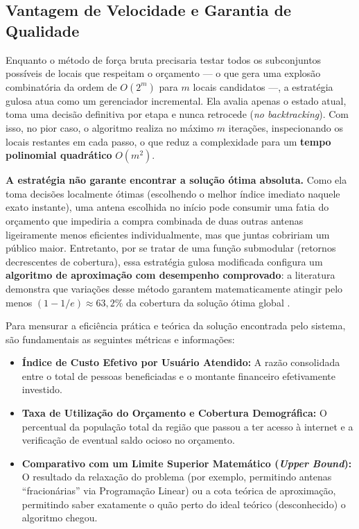 \subsection{Vantagem de Velocidade e Garantia de Qualidade}

Enquanto o método de força bruta precisaria testar todos os subconjuntos possíveis de locais que respeitam o orçamento --- o que gera uma explosão combinatória da ordem de $O(2^m)$ para $m$ locais candidatos ---, a estratégia gulosa atua como um gerenciador incremental. Ela avalia apenas o estado atual, toma uma decisão definitiva por etapa e nunca retrocede (\textit{no backtracking}). Com isso, no pior caso, o algoritmo realiza no máximo $m$ iterações, inspecionando os locais restantes em cada passo, o que reduz a complexidade para um \textbf{tempo polinomial quadrático} $O(m^2)$.

\textbf{A estratégia não garante encontrar a solução ótima absoluta.} Como ela toma decisões localmente ótimas (escolhendo o melhor índice imediato naquele exato instante), uma antena escolhida no início pode consumir uma fatia do orçamento que impediria a compra combinada de duas outras antenas ligeiramente menos eficientes individualmente, mas que juntas cobririam um público maior. Entretanto, por se tratar de uma função submodular (retornos decrescentes de cobertura), essa estratégia gulosa modificada configura um \textbf{algoritmo de aproximação com desempenho comprovado}: a literatura demonstra que variações desse método garantem matematicamente atingir pelo menos $(1 - 1/e) \approx 63,2\%$ da cobertura da solução ótima global \cite{wikipedia_maxcov}.

Para mensurar a eficiência prática e teórica da solução encontrada pelo sistema, são fundamentais as seguintes métricas e informações:

\begin{itemize}
    \item \textbf{Índice de Custo Efetivo por Usuário Atendido:} A razão consolidada entre o total de pessoas beneficiadas e o montante financeiro efetivamente investido.
    \item \textbf{Taxa de Utilização do Orçamento e Cobertura Demográfica:} O percentual da população total da região que passou a ter acesso à internet e a verificação de eventual saldo ocioso no orçamento.
    \item \textbf{Comparativo com um Limite Superior Matemático (\textit{Upper Bound}):} O resultado da relaxação do problema (por exemplo, permitindo antenas ``fracionárias'' via Programação Linear) ou a cota teórica de aproximação, permitindo saber exatamente o quão perto do ideal teórico (desconhecido) o algoritmo chegou.
\end{itemize}

